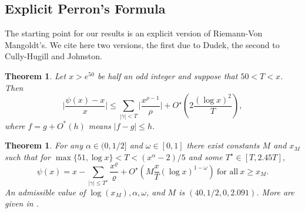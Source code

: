 \documentclass[10pt]{amsart}
\newtheorem{thm}[prop]{Theorem}
\theoremstyle{definition}
\numberwithin{equation}{section}
\begin{document}
\subsection{Explicit Perron's Formula}
The starting point for our results is an explicit version of Riemann-Von Mangoldt's. We cite here two versions, the first due to Dudek, the second to Cully-Hugill and Johnston. 
\begin{thm}\cite[Theorem 1.3]{Dud16}\label{Dud}
Let $x>e^{50}$ be half an odd integer and suppose that $50<T <x$. Then
\begin{equation} 
\Big|\frac{\psi(x) - x}x\Big| \le \sum_{|\gamma| < T} \Big| \frac{x^{\rho-1}}{\rho} \Big|
+  O^{\star} \left( 2\frac{(\log x)^2}{T} \right),
\end{equation} 
where $f=g+O^*(h)$ means $|f-g|\le h$. 
\end{thm}
%
\begin{thm}\cite[Theorem 1.2]{CulJoh21}\label{CHJ}
For any $\alpha\in (0,1/2]$ and $\omega\in[0,1]$ there exist constants $M$ and $x_M$ such that for $\max\{51,\log x\} < T < (x^{\alpha}-2)/5$ and some $T^{\star} \in [T, 2.45 T]$,
\begin{equation} 
\psi(x) = x - \sum_{|\gamma|\le T^{\star}} \frac{x^{\varrho}}{\varrho} + O^{\star} \left( M\frac{x}{T}(\log x)^{1-\omega} \right)\ \text{for all}\  x\ge x_M.
\end{equation} 
An admissible value of $\log(x_M), \alpha, \omega$, and $M$ is $(40, 1/2, 0, 2.091)$. More are given in \cite[Table 5]{CulJoh21}.
\end{thm}
\end{document}
